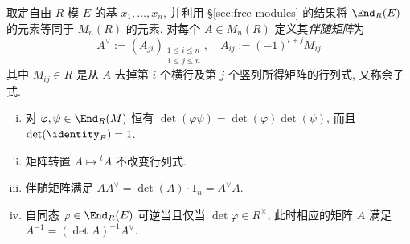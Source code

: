 \begin{theorem}\label{prop:matrix-det}
	取定自由 $R$-模 $E$ 的基 $x_1, \ldots, x_n$, 并利用 \S\ref{sec:free-modules} 的结果将 $\End_R(E)$ 的元素等同于 $M_n(R)$ 的元素. 对每个 $A \in M_n(R)$ 定义其\emph{伴随矩阵}为
	\[ A^\vee := (A_{ji})_{\substack{1 \leq i \leq n \\ 1 \leq j \leq n}}, \quad A_{ij} := (-1)^{i+j} M_{ij} \]
	其中 $M_{ij} \in R$ 是从 $A$ 去掉第 $i$ 个横行及第 $j$ 个竖列所得矩阵的行列式, 又称余子式.
	\begin{enumerate}[(i)]
		\item 对 $\varphi, \psi \in \End_R(M)$ 恒有 $\det(\varphi\psi) = \det(\varphi) \det(\psi)$, 而且 $\det(\identity_E) = 1$.
		\item 矩阵转置 $A \mapsto {}^t A$ 不改变行列式.
		\item 伴随矩阵满足 $A A^\vee = \det(A) \cdot 1_n = A^\vee A$.
		\item 自同态 $\varphi \in \End_R(E)$ 可逆当且仅当 $\det \varphi \in R^\times$, 此时相应的矩阵 $A$ 满足 $A^{-1} = (\det A)^{-1} A^\vee$.
	\end{enumerate}
\end{theorem}

